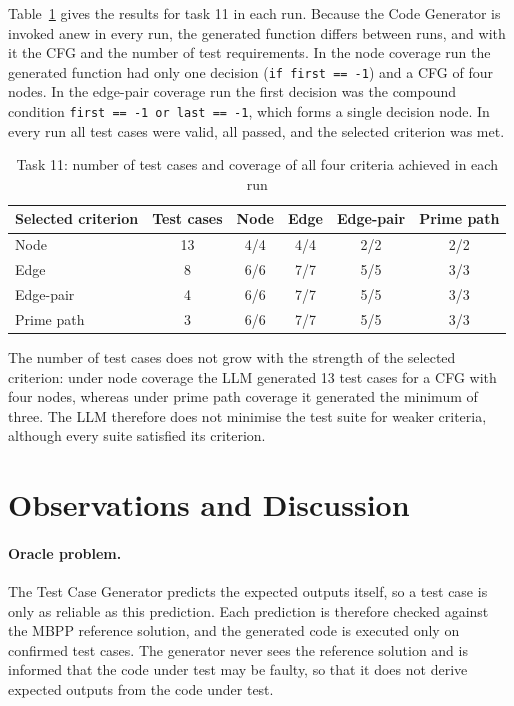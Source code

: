 \documentclass[11pt, a4paper]{article}
\begin{document}
Table~\ref{tab:task11criteria} gives the results for task 11 in each run. Because the Code Generator is invoked anew in every run, the generated function differs between runs, and with it the CFG and the number of test requirements. In the node coverage run the generated function had only one decision (\texttt{if first == -1}) and a CFG of four nodes. In the edge-pair coverage run the first decision was the compound condition \texttt{first == -1 or last == -1}, which forms a single decision node. In every run all test cases were valid, all passed, and the selected criterion was met.

\begin{table}[H]
    \centering
    \small
    \begin{tabular}{lccccc}
        \toprule
        \textbf{Selected criterion} & \textbf{Test cases} & \textbf{Node} & \textbf{Edge} & \textbf{Edge-pair} & \textbf{Prime path} \\
        \midrule
        Node & 13 & 4/4 & 4/4 & 2/2 & 2/2 \\
        Edge & 8 & 6/6 & 7/7 & 5/5 & 3/3 \\
        Edge-pair & 4 & 6/6 & 7/7 & 5/5 & 3/3 \\
        Prime path & 3 & 6/6 & 7/7 & 5/5 & 3/3 \\
        \bottomrule
    \end{tabular}
    \caption{Task 11: number of test cases and coverage of all four criteria achieved in each run}
    \label{tab:task11criteria}
\end{table}

The number of test cases does not grow with the strength of the selected criterion: under node coverage the LLM generated 13 test cases for a CFG with four nodes, whereas under prime path coverage it generated the minimum of three. The LLM therefore does not minimise the test suite for weaker criteria, although every suite satisfied its criterion.

\section{Observations and Discussion}
\label{sec:observations}

\paragraph{Oracle problem.} The Test Case Generator predicts the expected outputs itself, so a test case is only as reliable as this prediction. Each prediction is therefore checked against the MBPP reference solution, and the generated code is executed only on confirmed test cases. The generator never sees the reference solution and is informed that the code under test may be faulty, so that it does not derive expected outputs from the code under test.
\end{document}
